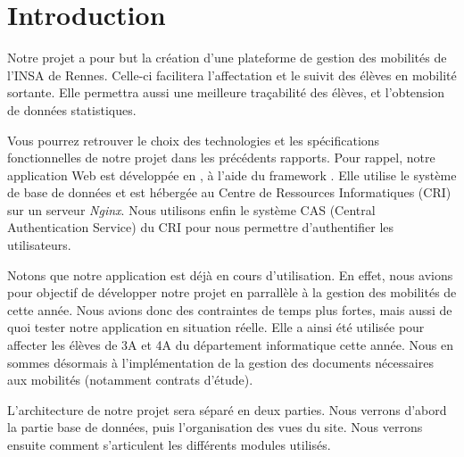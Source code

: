 \chapter{Introduction}

Notre projet a pour but la création d'une plateforme de gestion des mobilités de l'INSA de Rennes. Celle-ci facilitera l'affectation et le suivit des élèves en mobilité sortante. Elle permettra aussi une meilleure traçabilité des élèves, et l'obtension de données statistiques.

Vous pourrez retrouver le choix des technologies et les spécifications fonctionnelles de notre projet dans les précédents rapports. Pour rappel, notre application Web est développée en \php, à l'aide du framework \symfony. Elle utilise le système de base de données \mdb et est hébergée au Centre de Ressources Informatiques (CRI) sur un serveur \textit{Nginx}. Nous utilisons enfin le système CAS (Central Authentication Service) du CRI pour nous permettre d'authentifier les utilisateurs.

\bigbreak

Notons que notre application est déjà en cours d'utilisation. En effet, nous avions pour objectif de développer notre projet en parrallèle à la gestion des mobilités de cette année. Nous avions donc des contraintes de temps plus fortes, mais aussi de quoi tester notre application en situation réelle. Elle a ainsi été utilisée pour affecter les élèves de 3A et 4A du département informatique cette année. Nous en sommes désormais à l'implémentation de la gestion des documents nécessaires aux mobilités (notamment contrats d'étude).

\bigbreak

L'architecture de notre projet sera séparé en deux parties. Nous verrons d'abord la partie base de données, puis l'organisation des vues du site. Nous verrons ensuite comment s'articulent les différents modules utilisés.
